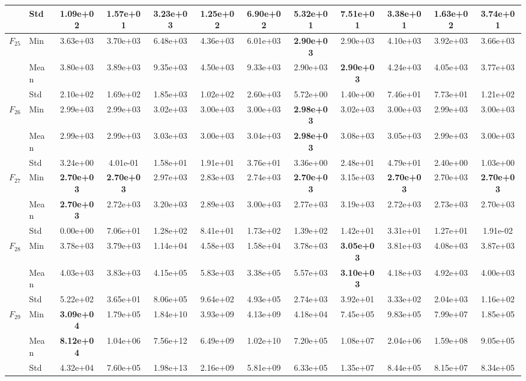 \begin{center}
\begin{longtable}{clcccccccccc}
 & Std & 1.09e+02 & 1.57e+01 & 3.23e+03 & 1.25e+02 & 6.90e+02 & 5.32e+01 & 7.51e+01 & 3.38e+01 & 1.63e+02 & 3.74e+01 \\
\midrule
\multirow{3}{*}{$F_{25}$} & Min & 3.63e+03 & 3.70e+03 & 6.48e+03 & 4.36e+03 & 6.01e+03 & \textbf{2.90e+03} & 2.90e+03 & 4.10e+03 & 3.92e+03 & 3.66e+03 \\
 & Mean & 3.80e+03 & 3.89e+03 & 9.35e+03 & 4.50e+03 & 9.33e+03 & 2.90e+03 & \textbf{2.90e+03} & 4.24e+03 & 4.05e+03 & 3.77e+03 \\
 & Std & 2.10e+02 & 1.69e+02 & 1.85e+03 & 1.02e+02 & 2.60e+03 & 5.72e+00 & 1.40e+00 & 7.46e+01 & 7.73e+01 & 1.21e+02 \\
\midrule
\multirow{3}{*}{$F_{26}$} & Min & 2.99e+03 & 2.99e+03 & 3.02e+03 & 3.00e+03 & 3.00e+03 & \textbf{2.98e+03} & 3.02e+03 & 3.00e+03 & 2.99e+03 & 3.00e+03 \\
 & Mean & 2.99e+03 & 2.99e+03 & 3.03e+03 & 3.00e+03 & 3.04e+03 & \textbf{2.98e+03} & 3.08e+03 & 3.05e+03 & 2.99e+03 & 3.00e+03 \\
 & Std & 3.24e+00 & 4.01e-01 & 1.58e+01 & 1.91e+01 & 3.76e+01 & 3.36e+00 & 2.48e+01 & 4.79e+01 & 2.40e+00 & 1.03e+00 \\
\midrule
\multirow{3}{*}{$F_{27}$} & Min & \textbf{2.70e+03} & \textbf{2.70e+03} & 2.97e+03 & 2.83e+03 & 2.74e+03 & \textbf{2.70e+03} & 3.15e+03 & \textbf{2.70e+03} & 2.70e+03 & \textbf{2.70e+03} \\
 & Mean & \textbf{2.70e+03} & 2.72e+03 & 3.20e+03 & 2.89e+03 & 3.00e+03 & 2.77e+03 & 3.19e+03 & 2.72e+03 & 2.73e+03 & 2.70e+03 \\
 & Std & 0.00e+00 & 7.06e+01 & 1.28e+02 & 8.41e+01 & 1.73e+02 & 1.39e+02 & 1.42e+01 & 3.31e+01 & 1.27e+01 & 1.91e-02 \\
\midrule
\multirow{3}{*}{$F_{28}$} & Min & 3.78e+03 & 3.79e+03 & 1.14e+04 & 4.58e+03 & 1.58e+04 & 3.78e+03 & \textbf{3.05e+03} & 3.81e+03 & 4.08e+03 & 3.87e+03 \\
 & Mean & 4.03e+03 & 3.83e+03 & 4.15e+05 & 5.83e+03 & 3.38e+05 & 5.57e+03 & \textbf{3.10e+03} & 4.18e+03 & 4.92e+03 & 4.00e+03 \\
 & Std & 5.22e+02 & 3.65e+01 & 8.06e+05 & 9.64e+02 & 4.93e+05 & 2.74e+03 & 3.92e+01 & 3.33e+02 & 2.04e+03 & 1.16e+02 \\
\midrule
\multirow{3}{*}{$F_{29}$} & Min & \textbf{3.09e+04} & 1.79e+05 & 1.84e+10 & 3.93e+09 & 4.13e+09 & 4.18e+04 & 7.45e+05 & 9.83e+05 & 7.99e+07 & 1.85e+05 \\
 & Mean & \textbf{8.12e+04} & 1.04e+06 & 7.56e+12 & 6.49e+09 & 1.02e+10 & 7.20e+05 & 1.08e+07 & 2.04e+06 & 1.59e+08 & 9.05e+05 \\
 & Std & 4.32e+04 & 7.60e+05 & 1.98e+13 & 2.16e+09 & 5.81e+09 & 6.33e+05 & 1.35e+07 & 8.44e+05 & 8.15e+07 & 8.34e+05 \\
\bottomrule
\end{longtable}
\end{center}